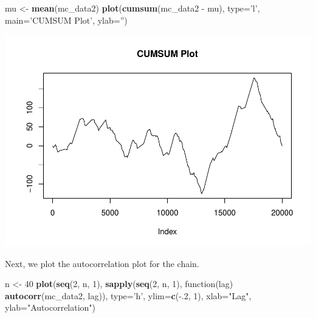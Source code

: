 \documentclass[]{article}
\newenvironment{Shaded}{\begin{snugshade}}{\end{snugshade}}
\newcommand{\KeywordTok}[1]{\textcolor[rgb]{0.13,0.29,0.53}{\textbf{{#1}}}}
\newcommand{\DataTypeTok}[1]{\textcolor[rgb]{0.13,0.29,0.53}{{#1}}}
\newcommand{\DecValTok}[1]{\textcolor[rgb]{0.00,0.00,0.81}{{#1}}}
\newcommand{\StringTok}[1]{\textcolor[rgb]{0.31,0.60,0.02}{{#1}}}
\newcommand{\NormalTok}[1]{{#1}}
\begin{document}
\begin{Shaded}
\begin{Highlighting}[]
\NormalTok{mu <-}\StringTok{ }\KeywordTok{mean}\NormalTok{(mc_data2)}
\KeywordTok{plot}\NormalTok{(}\KeywordTok{cumsum}\NormalTok{(mc_data2 -}\StringTok{ }\NormalTok{mu), }\DataTypeTok{type=}\StringTok{'l'}\NormalTok{, }\DataTypeTok{main=}\StringTok{'CUMSUM Plot'}\NormalTok{, }\DataTypeTok{ylab=}\StringTok{''}\NormalTok{)}
\end{Highlighting}
\end{Shaded}

\includegraphics{Atlas-PS_6_files/figure-latex/unnamed-chunk-9-1.pdf}

Next, we plot the autocorrelation plot for the chain.

\begin{Shaded}
\begin{Highlighting}[]
\NormalTok{n <-}\StringTok{ }\DecValTok{40}
\KeywordTok{plot}\NormalTok{(}\KeywordTok{seq}\NormalTok{(}\DecValTok{2}\NormalTok{, n, }\DecValTok{1}\NormalTok{), }\KeywordTok{sapply}\NormalTok{(}\KeywordTok{seq}\NormalTok{(}\DecValTok{2}\NormalTok{, n, }\DecValTok{1}\NormalTok{), function(lag) }\KeywordTok{autocorr}\NormalTok{(mc_data2, lag)), }
     \DataTypeTok{type=}\StringTok{'h'}\NormalTok{, }\DataTypeTok{ylim=}\KeywordTok{c}\NormalTok{(-.}\DecValTok{2}\NormalTok{, }\DecValTok{1}\NormalTok{), }\DataTypeTok{xlab=}\StringTok{"Lag"}\NormalTok{, }\DataTypeTok{ylab=}\StringTok{"Autocorrelation"}\NormalTok{)}
\end{Highlighting}
\end{Shaded}
\end{document}
